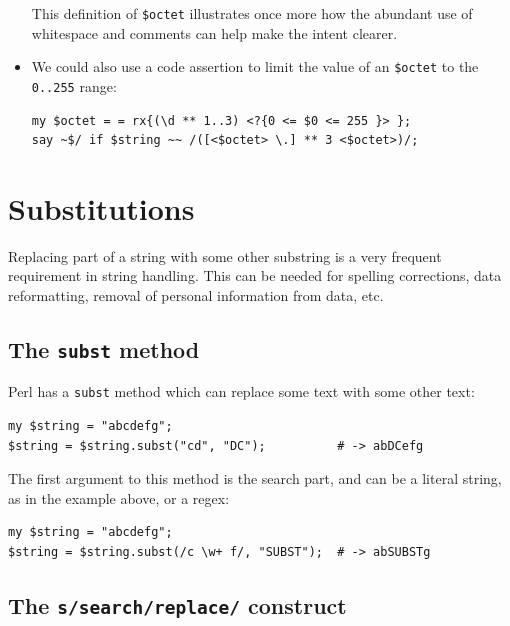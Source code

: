 \begin{itemize}
This definition of \verb'$octet' illustrates once more how 
the abundant use of whitespace and comments can help make 
the intent clearer.

\item We could also use 
a code assertion to limit the value of an \verb'$octet' to 
the \verb'0..255' range:

\begin{verbatim}
my $octet = = rx{(\d ** 1..3) <?{0 <= $0 <= 255 }> };
say ~$/ if $string ~~ /([<$octet> \.] ** 3 <$octet>)/;
\end{verbatim}
%

\end{itemize}


\section{Substitutions}
\label{substitutions}

Replacing part of a string with some other substring is a 
very frequent requirement in string handling. This can be 
needed for spelling corrections, data reformatting, removal 
of personal information from data, etc. 

\subsection{The {\tt subst} method}

Perl has a {\tt subst} method which can replace some text with 
some other text:

\begin{verbatim}
my $string = "abcdefg";
$string = $string.subst("cd", "DC");          # -> abDCefg
\end{verbatim}

The first argument to this method is the search part, and 
can be a literal string, as in the example above, or a regex:

\begin{verbatim}
my $string = "abcdefg";
$string = $string.subst(/c \w+ f/, "SUBST");  # -> abSUBSTg
\end{verbatim}

\subsection{The {\tt s/search/replace/} construct}

